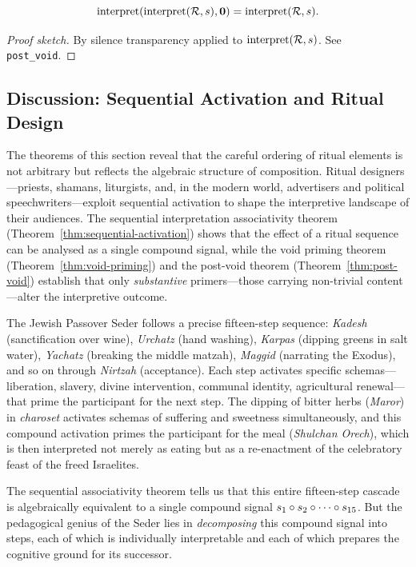 \begin{theorem}
\label{thm:post-void}
\[
  \operatorname{interpret}(\operatorname{interpret}(\mathcal{R}, s), \mathbf{0})
  = \operatorname{interpret}(\mathcal{R}, s).
\]
\end{theorem}

\begin{proof}[Proof sketch]
By silence transparency applied to $\operatorname{interpret}(\mathcal{R}, s)$.
See \texttt{post\_void}.
\end{proof}

\subsection*{Discussion: Sequential Activation and Ritual Design}

The theorems of this section reveal that the careful ordering of
ritual elements is not arbitrary but reflects the algebraic structure
of composition.  Ritual designers---priests, shamans, liturgists,
and, in the modern world, advertisers and political
speechwriters---exploit sequential activation to shape the
interpretive landscape of their audiences.  The sequential
interpretation associativity theorem
(Theorem~\ref{thm:sequential-activation}) shows that the effect of a
ritual sequence can be analysed as a single compound signal, while
the void priming theorem (Theorem~\ref{thm:void-priming}) and the
post-void theorem (Theorem~\ref{thm:post-void}) establish that only
\emph{substantive} primers---those carrying non-trivial content---alter
the interpretive outcome.

\begin{example}
\label{ex:seder}
The Jewish Passover Seder follows a precise fifteen-step sequence:
\emph{Kadesh} (sanctification over wine), \emph{Urchatz} (hand
washing), \emph{Karpas} (dipping greens in salt water),
\emph{Yachatz} (breaking the middle matzah), \emph{Maggid}
(narrating the Exodus), and so on through \emph{Nirtzah} (acceptance).
Each step activates specific schemas---liberation, slavery, divine
intervention, communal identity, agricultural renewal---that prime
the participant for the next step.  The dipping of bitter herbs
(\emph{Maror}) in \emph{charoset} activates schemas of suffering and
sweetness simultaneously, and this compound activation primes the
participant for the meal (\emph{Shulchan Orech}), which is then
interpreted not merely as eating but as a re-enactment of the
celebratory feast of the freed Israelites.

The sequential associativity theorem tells us that this entire
fifteen-step cascade is algebraically equivalent to a single compound
signal $s_1 \circ s_2 \circ \cdots \circ s_{15}$.  But the
pedagogical genius of the Seder lies in \emph{decomposing} this
compound signal into steps, each of which is individually
interpretable and each of which prepares the cognitive ground for its
successor.
\end{example}

